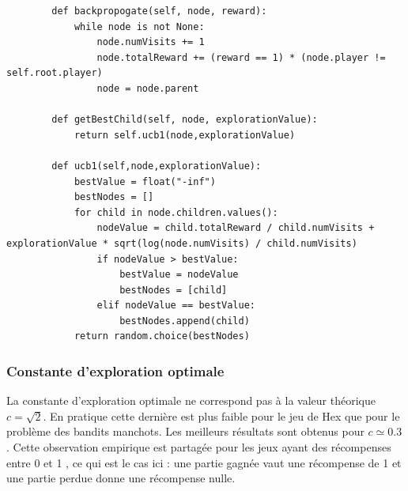 \documentclass[a4paper]{article}
\theoremstyle{definition}
\begin{document}
\begin{lstlisting}
		def backpropogate(self, node, reward):
			while node is not None:
				node.numVisits += 1
				node.totalReward += (reward == 1) * (node.player != self.root.player)
				node = node.parent
		
		def getBestChild(self, node, explorationValue):
			return self.ucb1(node,explorationValue)
		
		def ucb1(self,node,explorationValue):
			bestValue = float("-inf")
			bestNodes = []
			for child in node.children.values():
				nodeValue = child.totalReward / child.numVisits + explorationValue * sqrt(log(node.numVisits) / child.numVisits)
				if nodeValue > bestValue:
					bestValue = nodeValue
					bestNodes = [child]
				elif nodeValue == bestValue:
					bestNodes.append(child)
			return random.choice(bestNodes)
\end{lstlisting}

\newpage

\subsubsection{Constante d'exploration optimale}

La constante d'exploration optimale ne correspond pas à la valeur théorique $c=\sqrt{2}$. En pratique cette dernière est plus faible pour le jeu de Hex que pour le problème des bandits manchots. Les meilleurs résultats sont obtenus pour $c \simeq 0.3$. Cette observation empirique est partagée pour les jeux ayant des récompenses entre 0 et 1 \cite{cazenav}, ce qui est le cas ici : une partie gagnée vaut une récompense de 1 et une partie perdue donne une récompense nulle.
\end{document}

